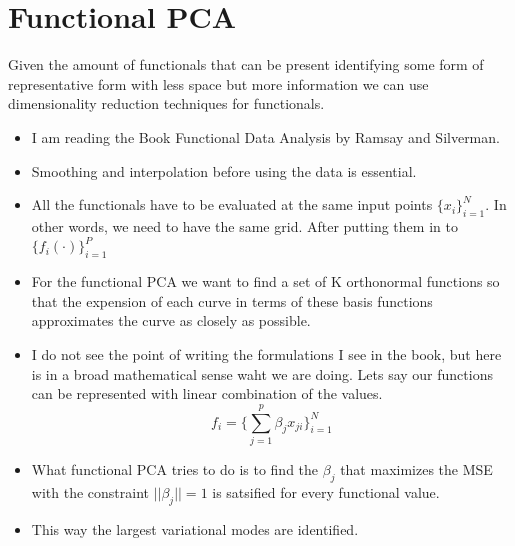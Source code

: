 \documentclass{tran-l}
\theoremstyle{definition}
\theoremstyle{remark}
\numberwithin{equation}{section}
\begin{document}
\section{Functional PCA}

Given the amount of functionals that can be present identifying  some form of representative form with less space but more information we can use dimensionality reduction techniques for functionals.

\begin{itemize}
  \item I am reading the Book Functional Data Analysis by Ramsay and Silverman.
  \item Smoothing and interpolation before using the data is essential.
  \item All the functionals have to be evaluated at the same input points $\{x_i\}_{i=1}^{N}$. In other words, we need to have the same grid. After putting them in to $\{f_i(\cdot)\}_{i=1}^P$
  \item For the functional PCA we want to find a set of K orthonormal functions so that the expension of each curve in terms of these basis functions approximates the curve as closely as possible.
  \item I do not see the point of writing the formulations I see in the book, but here is in a broad mathematical sense waht we are doing. Lets say our functions can be represented with linear combination of the values.
    \begin{equation}
      f_i = \{\sum_{j=1}^p \beta_j x_{ji}\}_{i=1}^N
    \end{equation}
  \item What functional PCA tries to do is to find the $\beta_j$ that maximizes the MSE with the constraint $||\beta_j||=1$ is satsified for every functional value.
  \item This way the largest variational modes are identified.
\end{itemize}
\end{document}
